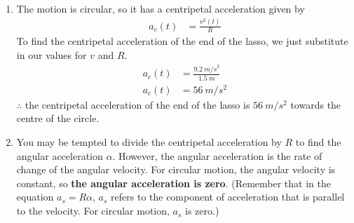 \begin{enumerate}[label=\alph*)]
\item The motion is circular, so it has a centripetal acceleration given by
\begin{align*}
a_c(t)&=\frac{v^2(t)}{R}
\end{align*}
To find the centripetal acceleration of the end of the lasso, we just substitute in our values for $v$ and $R$.
\begin{align*}
a_c(t)&=\frac{\SI{9.2}{m/s}^2}{\SI{1.5}{m}}\\
a_c(t)&=\SI{56}{m/s^2}
\end{align*}
$\therefore$ the centripetal acceleration of the end of the lasso is $\SI{56}{m/s^2}$ towards the centre of the circle. 
\item You may be tempted to divide the centripetal acceleration by $R$ to find the angular acceleration $\alpha$. However, the angular acceleration is the rate of change of the angular velocity. For circular motion, the angular velocity is constant, so \textbf{the angular acceleration is zero}. (Remember that in the equation $a_s=R\alpha$, $a_s$ refers to the component of acceleration that is parallel to the velocity. For circular motion, $a_s$ is zero.)
\end{enumerate}




